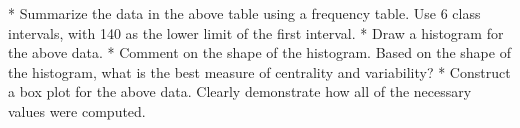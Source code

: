 
\begin{enumerate}
* Summarize the data in the above table using a frequency table. Use 6 class intervals, with 140 as the lower limit of the first interval.
* Draw a histogram for the above data.
* Comment on the shape of the histogram. Based on the shape of the histogram, what is the best measure of centrality and variability?
* Construct a box plot for the above data. Clearly demonstrate how all of the necessary values were computed.
\end{enumerate}


